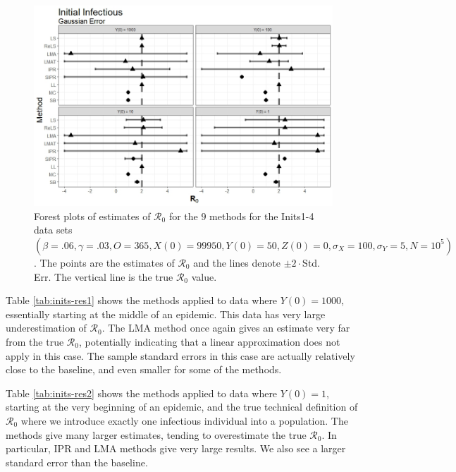 \documentclass[12pt]{article}
\newcommand{\xxsir}{\ensuremath{9} } %
\newcommand{\rr}{\ensuremath{\mathcal{R}_0}}
\begin{document}
\begin{figure}[H]
  \centering
  \includegraphics[scale=0.5]{images/start_n.jpeg}
    \caption{Forest plots of estimates of $\rr$ for the \xxsir methods for the Inits1-4 data sets $(\beta=.06, \gamma=.03, O=365, X(0)=99950, Y(0)=50, Z(0)=0, \sigma_X=100, \sigma_Y=5, N=10^5)$.  The points are the estimates of $\rr$ and the lines denote $\pm 2\cdot $Std. Err.  The vertical line is the true $\rr$ value.}\label{fig:inits-res}
  \end{figure}

  Table \ref{tab:inits-res1} shows the methods applied to data where $Y(0) = 1000$, essentially starting at the middle of an epidemic. This data has very large underestimation of $\rr$. The LMA method once again gives an estimate very far from the true $\rr$, potentially indicating that a linear approximation does not apply in this case. The sample standard errors in this case are actually relatively close to the baseline, and even smaller for some of the methods.

Table \ref{tab:inits-res2} shows the methods applied to data where $Y(0) = 1$, starting at the very beginning of an epidemic, and the true technical definition of $\rr$ where we introduce exactly one infectious individual into a population. The methods give many larger estimates, tending to overestimate the true $\rr$. In particular, IPR and LMA methods give very large results. We also see a larger standard error than the baseline.
\end{document}
